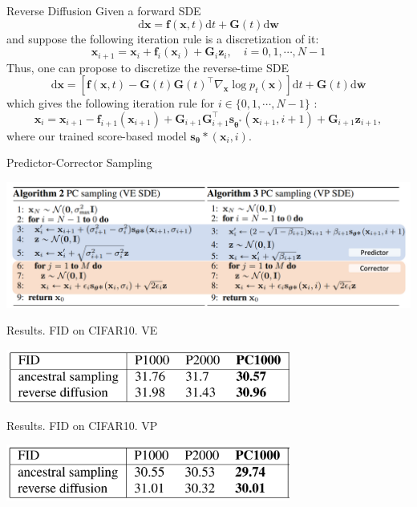 \documentclass[xcolor=dvipsnames]{beamer}
\begin{document}
    \begin{frame}{Reverse Diffusion}
        Given a forward SDE
$$
\mathrm{d} \mathbf{x}=\mathbf{f}(\mathbf{x}, t) \mathrm{d} t+\mathbf{G}(t) \mathrm{d} \mathbf{w}
$$
and suppose the following iteration rule is a discretization of it:
$$
\mathbf{x}_{i+1}=\mathbf{x}_i+\mathbf{f}_i\left(\mathbf{x}_i\right)+\mathbf{G}_i \mathbf{z}_i, \quad i=0,1, \cdots, N-1
$$
Thus, one can propose to discretize the reverse-time SDE
$$
\mathrm{d} \mathbf{x}=\left[\mathbf{f}(\mathbf{x}, t)-\mathbf{G}(t) \mathbf{G}(t)^{\top} \nabla_{\mathbf{x}} \log p_t(\mathbf{x})\right] \mathrm{d} t+\mathbf{G}(t) \mathrm{d} \overline{\mathbf{w}}
$$
which gives the following iteration rule for $i \in\{0,1, \cdots, N-1\}$ :
$$
\mathbf{x}_i=\mathbf{x}_{i+1}-\mathbf{f}_{i+1}\left(\mathbf{x}_{i+1}\right)+\mathbf{G}_{i+1} \mathbf{G}_{i+1}^{\top} \mathbf{s}_{\boldsymbol{\theta}^*}\left(\mathbf{x}_{i+1}, i+1\right)+\mathbf{G}_{i+1} \mathbf{z}_{i+1},
$$
where our trained score-based model $\mathbf{s}_{\boldsymbol{\theta}} *\left(\mathbf{x}_i, i\right)$.
    \end{frame}

    \begin{frame}{Predictor-Corrector Sampling}
        \begin{center}
            \includegraphics[width=\textwidth]{pics/PC.png}
        \end{center}
    \end{frame}

    \begin{frame}{Results. FID on CIFAR10. VE}            
        \begin{center}
            \includegraphics[width=0.7\textwidth]{pics/VE_table.png}
        \end{center}
    \end{frame}


    \begin{frame}{Results. FID on CIFAR10. VP}            
        \begin{center}
            \includegraphics[width=0.7\textwidth]{pics/VP_table.png}
        \end{center}
    \end{frame}
\end{document}
